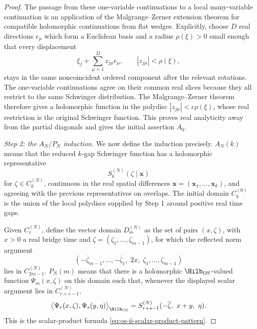 \begin{proof}
The passage from these one-variable continuations to a local
many-variable continuation is an application of the Malgrange--Zerner
extension theorem for compatible holomorphic continuations from flat wedges.
Explicitly, choose \(D\) real directions \(e_\mu\) which form a Euclidean
basis and a radius \(\rho(\xi)>0\) small enough that every displacement
\[
  \xi_j+\sum_{\mu=1}^D z_{j\mu}e_\mu,
  \qquad |z_{j\mu}|<\rho(\xi),
\]
stays in the same noncoincident ordered component after the relevant
rotations.  The one-variable continuations agree on their common real slices
because they all restrict to the same Schwinger distribution.  The
Malgrange--Zerner theorem therefore gives a holomorphic function in the
polydisc \(|z_{j\mu}|<c\rho(\xi)\), whose real restriction is the original
Schwinger function.  This proves real analyticity away from the partial
diagonals and gives the initial assertion \(A_0\).

\emph{Step 2: the \(A_N/P_N\) induction.}
We now define the induction precisely.  \(A_N(k)\) means that the reduced
\(k\)-gap Schwinger function has a holomorphic representative
\[
  S_k^{(N)}(\zeta\mid\mathbf x)
\]
for \(\zeta\in C_k^{(N)}\), continuous in the real spatial differences
\(\mathbf x=(\mathbf x_1,\ldots,\mathbf x_k)\), and agreeing with the
previous representatives on overlaps.  The initial domain \(C_k^{(0)}\)
is the union of the local polydiscs supplied by Step 1 around positive real
time gaps.

Given \(C_\ell^{(N)}\), define the vector domain \(D_m^{(N)}\) as the set of
pairs \((x,\zeta)\), with \(x>0\) a real bridge time and
\(\zeta=(\zeta_1,\ldots,\zeta_{m-1})\), for which the reflected norm argument
\[
  (-\overline\zeta_{m-1},\ldots,-\overline\zeta_1,\;2x,\;
    \zeta_1,\ldots,\zeta_{m-1})
\]
lies in \(C_{2m-1}^{(N)}\).  \(P_N(m)\) means that there is a holomorphic
\(\Hilb_{\rm OS}\)-valued function \(\Psi_m(x,\zeta)\) on this domain such
that, whenever the displayed scalar argument lies in \(C_{r+s-1}^{(N)}\),
  \begin{equation}
  \bigl\langle
    \Psi_r(x,\zeta),\Psi_s(y,\eta)
  \bigr\rangle_{\Hilb_{\rm OS}}
  =
  S_{r+s-1}^{(N)}
  (-\overline\zeta,\ x+y,\ \eta).
	  \label{eq:os-induction-scalar-product}
  \end{equation}
This is the scalar-product formula
\eqref{eq:os-ii-scalar-product-pattern}.


\end{proof}
